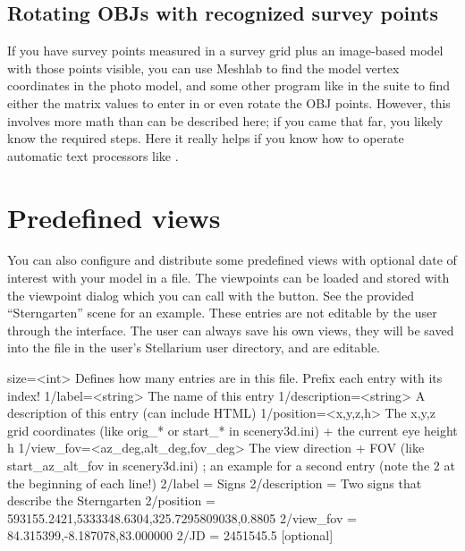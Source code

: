 \subsection{Rotating OBJs with recognized survey points}
\label{sec:scenery3d:RotatingOBJ}

If you have survey points measured in a survey grid plus an image-based model
with those points visible, you can use Meshlab to find the model
vertex coordinates in the photo model, and some other program like
 in the  suite to find either the matrix
values to enter in  or even rotate the OBJ
points. However, this involves more math than can be described here;
if you came that far, you likely know the required steps.  Here it
really helps if you know how to operate automatic text processors like
.

\section{Predefined views}
You can also configure and distribute some predefined views with optional date of interest with your
model in a  file. The viewpoints can be loaded
and stored with the viewpoint dialog which you can call with the
 button. See the provided
``Sterngarten'' scene for an example. These entries are not editable
by the user through the interface. The user can always save his own
views, they will be saved into the file  in the
user's Stellarium user directory, and are editable.

\begin{configfileScr}
[StoredViews]
size=<int>              Defines how many entries are in this file. 
                        Prefix each entry with its index!
1/label=<string>        The name of this entry
1/description=<string>  A description of this entry (can include HTML)
1/position=<x,y,z,h>    The x,y,z grid coordinates 
                        (like orig_* or start_* in scenery3d.ini) 
                        + the current eye height h
1/view_fov=<az_deg,alt_deg,fov_deg>  The view direction + FOV
                                     (like start_az_alt_fov in scenery3d.ini)
; an example for a second entry (note the 2 at the beginning of each line!)
2/label       = Signs
2/description = Two signs that describe the Sterngarten
2/position    = 593155.2421,5333348.6304,325.7295809038,0.8805
2/view_fov    = 84.315399,-8.187078,83.000000
2/JD          = 2451545.5 [optional]
\end{configfileScr}

